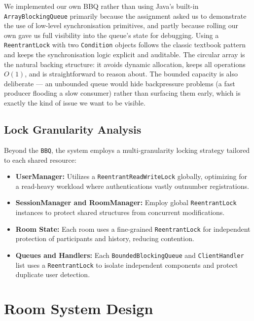 \documentclass[12pt,a4paper]{article}
\begin{document}
\bigskip
We implemented our own BBQ rather than using Java's built-in
\texttt{ArrayBlockingQueue} primarily because the assignment asked us to
demonstrate the use of low-level synchronisation primitives, and partly because
rolling our own gave us full visibility into the queue's state for debugging.
Using a \texttt{ReentrantLock} with two \texttt{Condition} objects follows the
classic textbook pattern and keeps the synchronisation logic explicit and
auditable. The circular array is the natural backing structure: it avoids
dynamic allocation, keeps all operations $O(1)$, and is straightforward to
reason about. The bounded capacity is also deliberate --- an unbounded queue
would hide backpressure problems (a fast producer flooding a slow consumer)
rather than surfacing them early, which is exactly the kind of issue we want to
be visible.

\subsection{Lock Granularity Analysis}
Beyond the \texttt{BBQ}, the system employs a multi-granularity locking strategy tailored to each shared resource:
\begin{itemize}
    \item \textbf{UserManager:} Utilizes a \texttt{ReentrantReadWriteLock} globally, optimizing for a read-heavy workload where authentications vastly outnumber registrations.
    \item \textbf{SessionManager and RoomManager:} Employ global \texttt{ReentrantLock} instances to protect shared structures from concurrent modifications.
    \item \textbf{Room State:} Each room uses a fine-grained \texttt{ReentrantLock} for independent protection of participants and history, reducing contention.
    \item \textbf{Queues and Handlers:} Each \texttt{BoundedBlockingQueue} and \texttt{ClientHandler} list uses a \texttt{ReentrantLock} to isolate independent components and protect duplicate user detection.
\end{itemize}

\section{Room System Design}
\label{sec:room_system}
\end{document}
